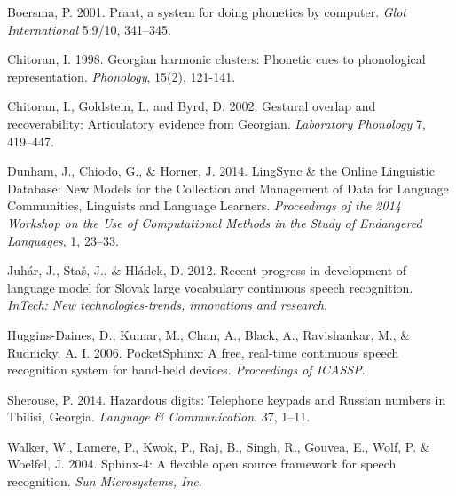 \documentclass[12pt]{amsart}
\begin{document}
\begin{thebibliography}{17}

Boersma, P. 2001. Praat, a system for doing phonetics by computer. \emph{Glot International} 5:9/10, 341--345.

Chitoran, I. 1998. Georgian harmonic clusters: Phonetic cues to phonological representation. \emph{Phonology}, 15(2), 121-141.

Chitoran, I., Goldstein, L. and Byrd, D. 2002. Gestural overlap and recoverability: Articulatory evidence from Georgian. \emph{Laboratory Phonology} 7, 419--447.

Dunham, J., Chiodo, G., \& Horner, J. 2014. LingSync \& the Online Linguistic Database: New Models for the Collection and Management of Data for Language Communities, Linguists and Language Learners. \emph{Proceedings of the 2014 Workshop on the Use of Computational Methods in the Study of Endangered Languages}, 1, 23--33.

Juh{\'a}r, J., Sta{\v{s}}, J., \& Hl{\'a}dek, D. 2012. Recent progress in development of language model for Slovak large vocabulary continuous speech recognition. \emph{InTech: New technologies-trends, innovations and research}.


Huggins-Daines, D., Kumar, M., Chan, A., Black, A.,  Ravishankar, M., \& Rudnicky,  A. I. 2006. PocketSphinx: A free, real-time continuous speech recognition system for hand-held devices. \emph{Proceedings of ICASSP}.


Sherouse, P. 2014. Hazardous digits: Telephone keypads and Russian numbers in Tbilisi, Georgia. \emph{Language \& Communication}, 37, 1--11.


Walker, W., Lamere, P., Kwok, P., Raj, B., Singh, R., Gouvea, E., Wolf, P. \& Woelfel, J. 2004. Sphinx-4: A flexible open source framework for speech recognition. \emph{Sun Microsystems, Inc}.


\end{thebibliography}
\end{document}
